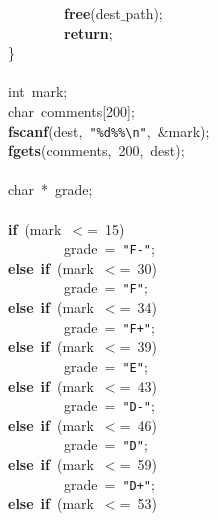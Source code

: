 \mbox{}\ \ \ \ \ \ \ \ \ \ \ \ \ \ \ \ \textbf{free}(dest$\_$path); \\
\mbox{}\ \ \ \ \ \ \ \ \ \ \ \ \ \ \ \ \textbf{return}; \\
\mbox{}\ \ \ \ \ \ \ \ \}\ \ \ \ \ \ \ \  \\
\mbox{} \\
\mbox{}\ \ \ \ \ \ \ \ int\ mark; \\
\mbox{}\ \ \ \ \ \ \ \ char\ comments[200]; \\
\mbox{}\ \ \ \ \ \ \ \ \textbf{fscanf}(dest,\ \texttt{"{}\%d\%\%}\texttt{\textbackslash{}n}\texttt{"{}},\ \&mark); \\
\mbox{}\ \ \ \ \ \ \ \ \textbf{fgets}(comments,\ 200,\ dest); \\
\mbox{} \\
\mbox{}\ \ \ \ \ \ \ \ char\ *\ grade; \\
\mbox{} \\
\mbox{}\ \ \ \ \ \ \ \ \textbf{if}\ (mark\ $<$=\ 15) \\
\mbox{}\ \ \ \ \ \ \ \ \ \ \ \ \ \ \ \ grade\ =\ \texttt{"{}F-"{}}; \\
\mbox{}\ \ \ \ \ \ \ \ \textbf{else}\ \textbf{if}\ (mark\ $<$=\ 30) \\
\mbox{}\ \ \ \ \ \ \ \ \ \ \ \ \ \ \ \ grade\ =\ \texttt{"{}F"{}}; \\
\mbox{}\ \ \ \ \ \ \ \ \textbf{else}\ \textbf{if}\ (mark\ $<$=\ 34) \\
\mbox{}\ \ \ \ \ \ \ \ \ \ \ \ \ \ \ \ grade\ =\ \texttt{"{}F+"{}}; \\
\mbox{}\ \ \ \ \ \ \ \ \textbf{else}\ \textbf{if}\ (mark\ $<$=\ 39) \\
\mbox{}\ \ \ \ \ \ \ \ \ \ \ \ \ \ \ \ grade\ =\ \texttt{"{}E"{}}; \\
\mbox{}\ \ \ \ \ \ \ \ \textbf{else}\ \textbf{if}\ (mark\ $<$=\ 43) \\
\mbox{}\ \ \ \ \ \ \ \ \ \ \ \ \ \ \ \ grade\ =\ \texttt{"{}D-"{}}; \\
\mbox{}\ \ \ \ \ \ \ \ \textbf{else}\ \textbf{if}\ (mark\ $<$=\ 46) \\
\mbox{}\ \ \ \ \ \ \ \ \ \ \ \ \ \ \ \ grade\ =\ \texttt{"{}D"{}}; \\
\mbox{}\ \ \ \ \ \ \ \ \textbf{else}\ \textbf{if}\ (mark\ $<$=\ 59) \\
\mbox{}\ \ \ \ \ \ \ \ \ \ \ \ \ \ \ \ grade\ =\ \texttt{"{}D+"{}}; \\
\mbox{}\ \ \ \ \ \ \ \ \textbf{else}\ \textbf{if}\ (mark\ $<$=\ 53) \\
